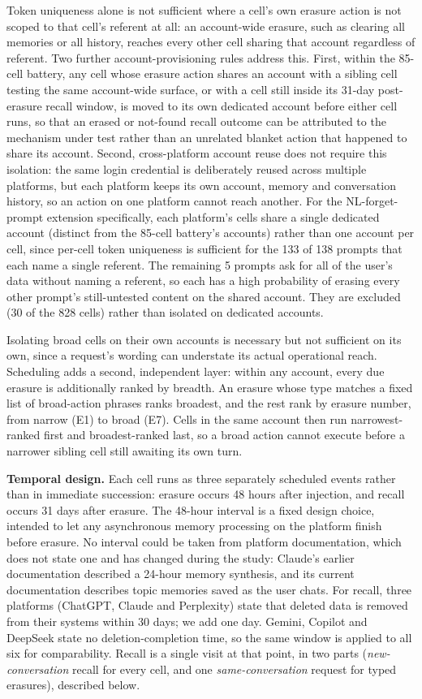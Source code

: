 \documentclass[conference,compsoc]{IEEEtran}
\begin{document}
Token uniqueness alone is not sufficient where a cell's own erasure
action is not scoped to that cell's referent at all: an account-wide
erasure, such as clearing all memories or all history, reaches every other
cell sharing that account regardless of referent. Two further account-provisioning rules
address this. First, within the 85-cell battery, any cell whose erasure
action shares an account with a sibling cell testing the same
account-wide surface, or with a cell still inside its 31-day post-erasure
recall window, is moved to its own dedicated account before either cell
runs, so that an erased or not-found recall outcome can
be attributed to the mechanism under test rather than an unrelated
blanket action that happened to share its account. Second, cross-platform
account reuse does not require this isolation: the same login credential
is deliberately reused across multiple platforms, but each platform keeps its
own account, memory and conversation history, so an action on one platform
cannot reach another. For the NL-forget-prompt extension specifically,
each platform's cells share a single dedicated account (distinct from
the 85-cell battery's accounts) rather than one account per cell, since
per-cell token uniqueness is sufficient for the 133 of 138 prompts that
each name a single referent. The remaining 5 prompts ask for all of the
user's data without naming a referent, so each has a high probability of
erasing every other prompt's still-untested content on the shared
account. They are excluded (30 of the 828 cells) rather than isolated on
dedicated accounts.

Isolating broad cells on their own accounts is necessary but not sufficient
on its own, since a request's wording can understate its actual operational
reach. Scheduling adds a second, independent layer: within any account, every
due erasure is additionally ranked by breadth. An erasure whose type matches a
fixed list of broad-action phrases ranks broadest, and the rest rank by erasure
number, from narrow (E1) to broad (E7). Cells in the same account then run
narrowest-ranked first and broadest-ranked last, so a broad action cannot
execute before a narrower sibling cell still awaiting its own turn.

\textbf{Temporal design.} Each cell runs as three separately scheduled
events rather than in immediate succession: erasure occurs 48 hours
after injection, and recall occurs 31 days after erasure. The 48-hour interval
is a fixed design choice, intended to let any asynchronous memory processing on
the platform finish before erasure. No interval could be taken from platform
documentation, which does not state one and has changed during the study:
Claude's earlier documentation described a 24-hour memory synthesis, and its
current documentation describes topic memories saved as the user chats. For
recall, three platforms (ChatGPT, Claude and
Perplexity) state that deleted data is removed from their systems within 30
days; we add one day. Gemini, Copilot and DeepSeek state no
deletion-completion time, so the same window is applied to all six for
comparability. Recall is a single visit at that point, in two parts
(\textit{new-conversation} recall for every cell, and one
\textit{same-conversation} request for typed erasures), described below.
\end{document}
